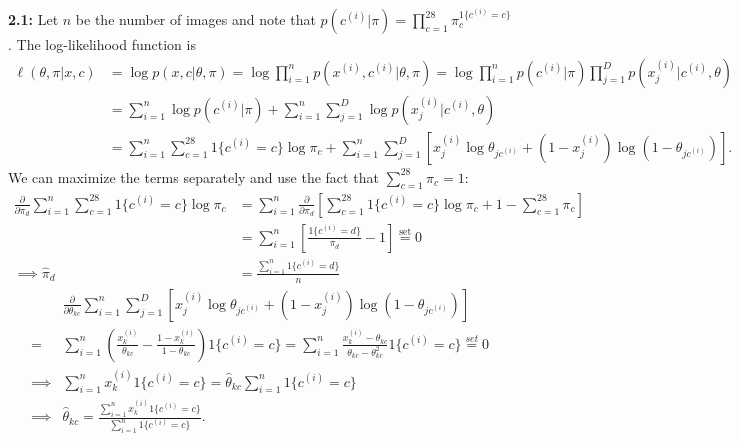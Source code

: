 \documentclass[12pt]{article}
\begin{document}
\textbf{2.1:} Let $n$ be the number of images and note that $p(c^{(i)}|\pi) = \prod_{c=1}^{28} \pi_c^{1\{c^{(i)}=c\}}$. The log-likelihood function is \begin{align*}
    \ell(\theta,\pi|x,c) &= \log p(x,c|\theta,\pi) = \log\prod_{i=1}^n p(x^{(i)},c^{(i)}|\theta,\pi) = \log\prod_{i=1}^n p(c^{(i)}|\pi)\prod_{j=1}^D p(x_j^{(i)}|c^{(i)},\theta)\\
    &= \sum_{i=1}^n\log p(c^{(i)}|\pi) + \sum_{i=1}^n\sum_{j=1}^D\log p(x_j^{(i)}|c^{(i)},\theta)\\
    &= \sum_{i=1}^n\sum_{c=1}^{28} 1\{c^{(i)}=c\}\log\pi_c + \sum_{i=1}^n\sum_{j=1}^D [x_j^{(i)}\log\theta_{jc^{(i)}} + (1-x_j^{(i)})\log(1-\theta_{jc^{(i)}})].
\end{align*} We can maximize the terms separately and use the fact that $\sum_{c=1}^{28} \pi_c = 1$: \begin{align*}
    \frac{\partial}{\partial\pi_d}\sum_{i=1}^n\sum_{c=1}^{28} 1\{c^{(i)}=c\}\log\pi_c &= \sum_{i=1}^n\frac{\partial}{\partial\pi_d}[\sum_{c=1}^{28}1\{c^{(i)}=c\}\log\pi_c + 1 - \sum_{c=1}^{28} \pi_c]\\
    &= \sum_{i=1}^n [\frac{1\{c^{(i)}=d\}}{\pi_d} - 1] \overset{\text{set}}{=} 0\\
    \implies \hat\pi_d &= \frac{\sum_{i=1}^n 1\{c^{(i)}=d\}}{n}
\end{align*}\begin{align*}
    &\frac{\partial}{\partial\theta_{kc}}\sum_{i=1}^n\sum_{j=1}^D [x_j^{(i)}\log\theta_{jc^{(i)}} + (1-x_j^{(i)})\log(1-\theta_{jc^{(i)}})]\\
    = &\sum_{i=1}^n(\frac{x_k^{(i)}}{\theta_{kc}}-\frac{1-x_k^{(i)}}{1-\theta_{kc}})1\{c^{(i)}=c\} = \sum_{i=1}^n\frac{x_k^{(i)}-\theta_{kc}}{\theta_{kc}-\theta_{kc}^2}1\{c^{(i)}=c\} \overset{set}{=} 0\\
    \implies &\sum_{i=1}^n x_k^{(i)}1\{c^{(i)}=c\} = \hat\theta_{kc}\sum_{i=1}^n 1\{c^{(i)}=c\}\\
    \implies &\hat\theta_{kc} = \frac{\sum_{i=1}^n x_k^{(i)}1\{c^{(i)}=c\}}{\sum_{i=1}^n 1\{c^{(i)}=c\}}.
\end{align*}
\end{document}
